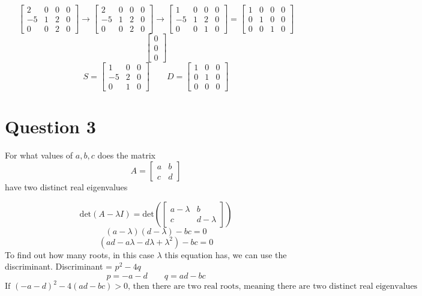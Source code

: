 \documentclass[hidelinks]{article}
\begin{document}
\[
	\begin{bmatrix} 2 & 0 & 0 & 0 \\ -5 & 1 & 2 & 0 \\ 0 & 0 & 2 & 0\end{bmatrix} \rightarrow \begin{bmatrix} 2 & 0 & 0 & 0 \\ -5 & 1 & 2 & 0 \\ 0 & 0 & 2 & 0\end{bmatrix} \rightarrow \begin{bmatrix} 1 & 0 & 0 & 0 \\ -5 & 1 & 2 & 0 \\ 0 & 0 & 1 & 0\end{bmatrix} = \begin{bmatrix} 1 & 0 & 0 & 0 \\ 0 & 1 & 0 & 0 \\ 0 & 0 & 1 & 0\end{bmatrix}
\]
\[
	\begin{bmatrix}0 \\ 0 \\ 0\end{bmatrix}
\]
\[
	S = \begin{bmatrix} 1 & 0 & 0 \\ -5 & 2 & 0 \\ 0 & 1 & 0 \end{bmatrix} \quad \quad D = \begin{bmatrix} 1 & 0 & 0 \\ 0  & 1 & 0 \\ 0 &0 & 0\end{bmatrix}
\]
\newpage
\section{Question 3}
For what values of $a, b, c$ does the matrix 
\[
	A = \begin{bmatrix} a & b \\ c & d\end{bmatrix}
\]
have two distinct real eigenvalues

\[
	\text{det}(A - \lambda I) = \text{det}( \begin{bmatrix} a -\lambda & b \\ c & d - \lambda \end{bmatrix})
\]
\[
	(a - \lambda)(d - \lambda) - bc = 0
\]
\[
	(ad -a\lambda - d\lambda + \lambda^2) - bc = 0
\]
To find out how many roots, in this case $\lambda$ this equation has, we can use the discriminant. Discriminant = $p^2 - 4q$
\[
	p = -a - d \quad \quad q = ad - bc 
\]
\[
	\text{If } (- a - d)^2 -4(ad - bc) > 0 \text{, then there are two real roots, meaning there are two distinct real eigenvalues}
\]
\newpage
\end{document}
